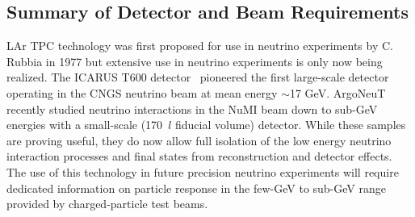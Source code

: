 



\subsection{Summary of Detector and Beam Requirements }
\label{detbeam_main}

LAr TPC technology was first proposed for use in neutrino experiments by C. Rubbia in 1977
\cite{CRubbia} but extensive use in neutrino experiments is only now being realized. 
The ICARUS T600 detector~\cite{icarus_mainref} pioneered the first large-scale detector operating in the CNGS 
neutrino beam at mean energy $\sim$17 GeV. ArgoNeuT~\cite{argoneut1}\cite{argoneut2} recently studied 
neutrino interactions in the NuMI beam down to sub-GeV energies with a small-scale (170~$l$ fiducial volume) detector. 
While these samples are proving useful, they do now allow full isolation of
the low energy neutrino interaction processes
and final states from reconstruction and detector effects. 
The use of this technology in future precision neutrino experiments will require dedicated 
information on particle response
in the few-GeV to sub-GeV range provided by charged-particle test beams. 

